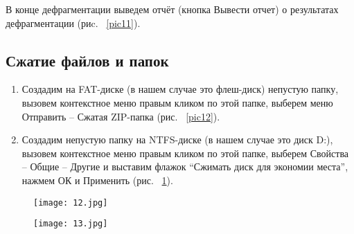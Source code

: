 В конце дефрагментации выведем отчёт (кнопка Вывести отчет) о результатах дефрагментации (риc. ~\ref{pic11}).

\subsection{Сжатие файлов и папок}

\begin{enumerate}
\item
  Создадим на FAT-диске (в нашем случае это флеш-диск) непустую папку, вызовем контекстное меню правым кликом по этой папке, выберем меню Отправить -- Сжатая ZIP-папка (рис. ~\ref{pic12}).
\item
  Создадим непустую папку на NTFS-диске (в нашем случае это диск D:), вызовем контекстное меню правым кликом по этой папке, выберем Свойства -- Общие -- Другие и выставим флажок ``Сжимать диск для экономии места'', нажмем ОК и Применить (рис. ~\ref{pic13}).

\end{enumerate}

\begin{figure}[h!t] 
  \begin{center}

  \begin{minipage}[h]{0.4\linewidth}

  \texttt{[image: 12.jpg]}
  \caption{\label{pic12}}

  \end{minipage}
  \hfill   
  \begin{minipage}[h]{0.4\linewidth}
  
  \texttt{[image: 13.jpg]}
  \caption{\label{pic13}}

  \end{minipage}          
  \end{center}
\end{figure}


